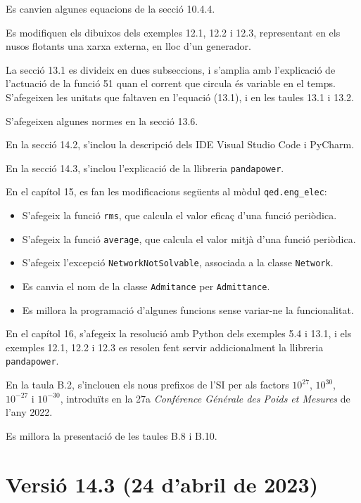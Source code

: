 Es canvien algunes equacions de la secció 10.4.4.

Es modifiquen els dibuixos dels exemples 12.1, 12.2 i 12.3, representant en els nusos flotants una xarxa externa, en lloc d'un generador.

La secció 13.1 es divideix en dues subseccions, i s'amplia amb l'explicació de l'actuació de la funció  51 quan el corrent que circula és variable en el temps. S'afegeixen les unitats que faltaven en l'equació (13.1), i en les taules 13.1 i 13.2.

S'afegeixen algunes normes en la secció 13.6.

En la secció 14.2, s'inclou la descripció dels IDE Visual Studio Code i PyCharm.

En la secció 14.3, s'inclou l'explicació de la llibreria \texttt{pandapower}.


En el capítol 15, es fan les modificacions següents al mòdul  \texttt{qed.eng\_elec}:
\begin{itemize}
	\item S'afegeix la funció \texttt{rms}, que calcula el valor eficaç d'una funció periòdica.
	\item S'afegeix la funció \texttt{average}, que calcula el valor mitjà d'una funció periòdica.
	\item S'afegeix l'excepció \texttt{NetworkNotSolvable}, associada a la classe \texttt{Network}.
	\item Es canvia el nom de la classe \texttt{Admitance} per \texttt{Admittance}.
	\item Es millora la programació d'algunes funcions sense variar-ne la funcionalitat.
\end{itemize}


En el capítol 16, s'afegeix la resolució amb Python dels exemples 5.4  i  13.1, i els exemples 12.1, 12.2 i 12.3 es resolen  fent servir addicionalment la llibreria \texttt{pandapower}.

En la taula B.2, s'inclouen els  nous prefixos de l'SI per als factors $10^{27}$,  $10^{30}$,  $10^{-27}$ i  $10^{-30}$, introduïts en la 27a \textit{Conférence Générale des Poids et Mesures} de l'any 2022.

Es millora la presentació de les taules B.8 i B.10.


\section*{Versió 14.3 (24 d'abril de 2023)}

